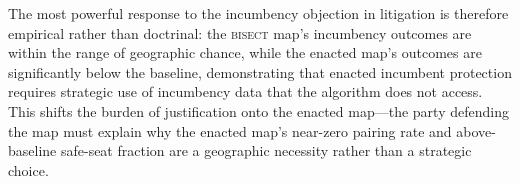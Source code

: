 The most powerful response to the incumbency objection in litigation is therefore
empirical rather than doctrinal: the \textsc{bisect} map's incumbency outcomes are
within the range of geographic chance, while the enacted map's outcomes are significantly
below the baseline, demonstrating that enacted incumbent protection requires strategic
use of incumbency data that the algorithm does not access. This shifts the burden of
justification onto the enacted map---the party defending the map must explain why the
enacted map's near-zero pairing rate and above-baseline safe-seat fraction are a
geographic necessity rather than a strategic choice.
